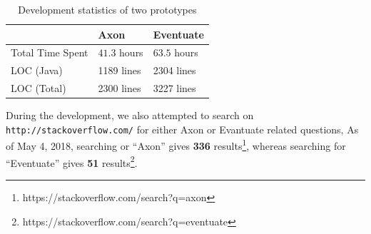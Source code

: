 \begin{table}[H]
    \begin{center}
        \begin{tabular}{ | m{2cm} | l | l | }

            \hline
            & Axon & Eventuate \\

            \hline
            Total Time Spent &
            $41.3$ hours &
            $63.5$ hours \\

            \hline
            LOC (Java) &
            1189 lines &
            2304 lines \\

            \hline
            LOC (Total) &
            2300 lines &
            3227 lines \\

            \hline

        \end{tabular}
    \end{center}
    \caption{Development statistics of two prototypes}
    \label{table:stats}
\end{table}

During the development, we also attempted to search on \texttt{http://stackoverflow.com/} for either Axon or Evantuate related questions, As of May 4, 2018, searching or ``Axon'' gives \textbf{336} results\footnote{https://stackoverflow.com/search?q=axon}, whereas searching for ``Eventuate'' gives \textbf{51} results\footnote{https://stackoverflow.com/search?q=eventuate}.
